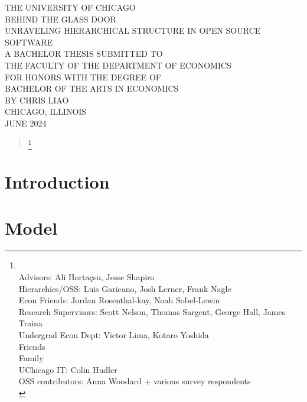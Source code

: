 \documentclass[12pt,notitlepage]{article}
\begin{document}
\begin{titlepage}
\begin{center}
THE UNIVERSITY OF CHICAGO
\\[1.5in]
BEHIND THE GLASS DOOR\\
UNRAVELING HIERARCHICAL STRUCTURE IN OPEN SOURCE SOFTWARE
\\[1in]
A BACHELOR THESIS SUBMITTED TO \\
\bigskip
THE FACULTY OF THE DEPARTMENT OF ECONOMICS \\
\bigskip
FOR HONORS WITH THE DEGREE OF \\
\bigskip
BACHELOR OF THE ARTS IN ECONOMICS
\\[1.5in]
BY CHRIS LIAO
\\[2in]
CHICAGO, ILLINOIS \\
JUNE 2024
\end{center}
\end{titlepage}

\tableofcontents
\newpage

\begin{abstract}
   \footnote{\\
   Advisors: Ali Hortaçsu, Jesse Shapiro\\
   Hierarchies/OSS: Luis Garicano, Josh Lerner, Frank Nagle\\
   Econ Friends: Jordan Rosenthal-kay, Noah Sobel-Lewin\\
   Research Supervisors: Scott Nelson, Thomas Sargent, George Hall, James Traina \\
   Undergrad Econ Dept: Victor Lima, Kotaro Yoshida\\
   Friends \\
   Family \\
   UChicago IT: Colin Hudler \\
   OSS contributors: Anna Woodard + various survey respondents \\
   }
\end{abstract}
\newpage
\section{Introduction}


\section{Model}

\end{document}
